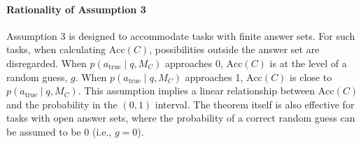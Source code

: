 \paragraph{Rationality of Assumption 3}
Assumption 3 is designed to accommodate tasks with finite answer sets. For such tasks, when calculating $\text{Acc}(C)$, possibilities outside the answer set are disregarded. When $p(a_{\text{true}} \mid q, M_C)$ approaches 0, $\text{Acc}(C)$ is at the level of a random guess, $g$. When $p(a_{\text{true}} \mid q, M_C)$ approaches 1, $\text{Acc}(C)$ is close to $p(a_{\text{true}} \mid q, M_C)$. This assumption implies a linear relationship between $\text{Acc}(C)$ and the probability in the $(0,1)$ interval. The theorem itself is also effective for tasks with open answer sets, where the probability of a correct random guess can be assumed to be 0 (i.e., $g=0$).







